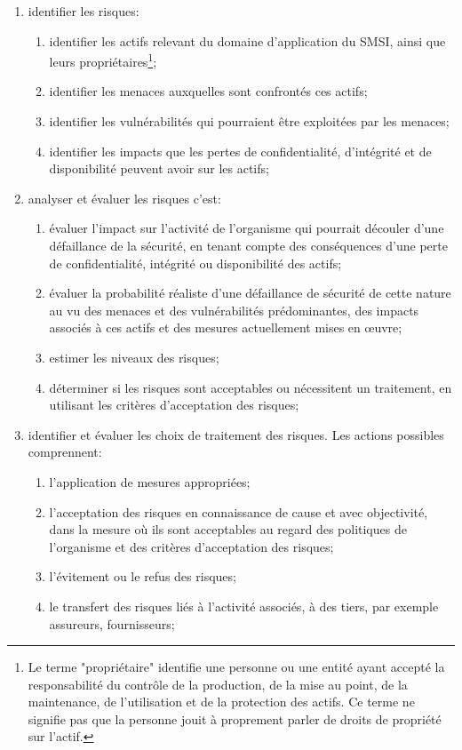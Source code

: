 \begin{enumerate}
	\item identifier les risques:
	\begin{enumerate}
		\item identifier les actifs relevant du domaine d'application du SMSI, ainsi que leurs propriétaires\footnote{Le terme "propriétaire" identifie une personne ou une entité ayant accepté la responsabilité du contrôle de la production, de la mise au point, de la maintenance, de l’utilisation et de la protection des actifs. Ce terme ne signifie pas que la personne jouit à proprement parler de droits de propriété sur l'actif.};
		\item identifier les menaces auxquelles sont confrontés ces actifs;
		\item identifier les vulnérabilités qui pourraient être exploitées par les menaces;
		\item identifier les impacts que les pertes de confidentialité, d'intégrité et de disponibilité peuvent avoir sur les actifs;
	\end{enumerate}

	\item analyser et évaluer les risques c'est:
	\begin{enumerate}
		\item évaluer l'impact sur l'activité de l'organisme qui pourrait découler d'une défaillance de la sécurité, en tenant compte des conséquences d'une perte de confidentialité, intégrité ou disponibilité des actifs;
		\item évaluer la probabilité réaliste d'une défaillance de sécurité de cette nature au vu des menaces et des vulnérabilités prédominantes, des impacts associés à ces actifs et des mesures actuellement mises en \oe{}uvre;
		\item estimer les niveaux des risques;
		\item déterminer si les risques sont acceptables ou nécessitent un traitement, en utilisant les critères d'acceptation des risques;
	\end{enumerate}

	\item identifier et évaluer les choix de traitement des risques. Les actions possibles comprennent:
	\begin{enumerate}
		\item l'application de mesures appropriées;
		\item l'acceptation des risques en connaissance de cause et avec objectivité, dans la mesure où ils sont acceptables au regard des politiques de l'organisme et des critères d'acceptation des risques;
		\item l’évitement ou le refus des risques;
		\item le transfert des risques liés à l'activité associés, à des tiers, par exemple assureurs, fournisseurs;
	\end{enumerate}


\end{enumerate}
